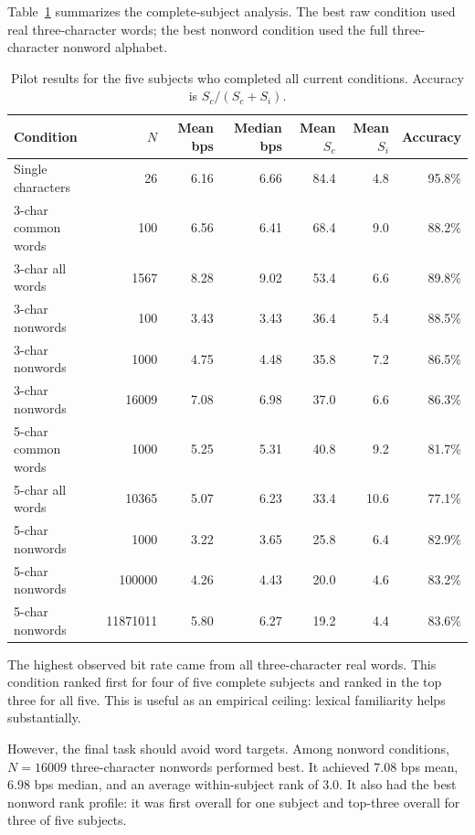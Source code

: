 \documentclass[11pt]{article}
\begin{document}
Table~\ref{tab:results} summarizes the complete-subject analysis. The best raw condition used real three-character words; the best nonword condition used the full three-character nonword alphabet.

\begin{table}[ht]
\centering
\small
\begin{tabular}{lrrrrrr}
\toprule
Condition & \(N\) & Mean bps & Median bps & Mean \(S_c\) & Mean \(S_i\) & Accuracy \\
\midrule
Single characters & 26 & 6.16 & 6.66 & 84.4 & 4.8 & 95.8\% \\
3-char common words & 100 & 6.56 & 6.41 & 68.4 & 9.0 & 88.2\% \\
3-char all words & 1567 & 8.28 & 9.02 & 53.4 & 6.6 & 89.8\% \\
3-char nonwords & 100 & 3.43 & 3.43 & 36.4 & 5.4 & 88.5\% \\
3-char nonwords & 1000 & 4.75 & 4.48 & 35.8 & 7.2 & 86.5\% \\
3-char nonwords & 16009 & 7.08 & 6.98 & 37.0 & 6.6 & 86.3\% \\
5-char common words & 1000 & 5.25 & 5.31 & 40.8 & 9.2 & 81.7\% \\
5-char all words & 10365 & 5.07 & 6.23 & 33.4 & 10.6 & 77.1\% \\
5-char nonwords & 1000 & 3.22 & 3.65 & 25.8 & 6.4 & 82.9\% \\
5-char nonwords & 100000 & 4.26 & 4.43 & 20.0 & 4.6 & 83.2\% \\
5-char nonwords & 11871011 & 5.80 & 6.27 & 19.2 & 4.4 & 83.6\% \\
\bottomrule
\end{tabular}
\caption{Pilot results for the five subjects who completed all current conditions. Accuracy is \(S_c/(S_c+S_i)\).}
\label{tab:results}
\end{table}

The highest observed bit rate came from all three-character real words. This condition ranked first for four of five complete subjects and ranked in the top three for all five. This is useful as an empirical ceiling: lexical familiarity helps substantially.

However, the final task should avoid word targets. Among nonword conditions, \(N=16009\) three-character nonwords performed best. It achieved 7.08 bps mean, 6.98 bps median, and an average within-subject rank of 3.0. It also had the best nonword rank profile: it was first overall for one subject and top-three overall for three of five subjects.
\end{document}
